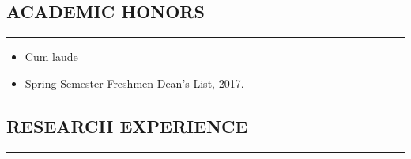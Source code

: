 \documentclass[10pt,a4]{article}
\begin{document}
\begin{small}
%
%	
%
%


\subsection*{ACADEMIC HONORS}
\hrule
\vspace{0.2cm}
\begin{itemize}

\item Cum laude

\item Spring Semester Freshmen Dean's List, 2017.

\end{itemize}

\pagestyle{fancy}
\lhead{\textcolor{gray}{\it Junghyun Lee}}
\fancyfoot[C]{}



\subsection*{RESEARCH EXPERIENCE}
\hrule
\vspace{0.2cm}
\begin{itemize}
  

\end{itemize}
\end{small}
\end{document}
